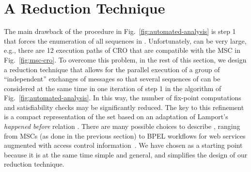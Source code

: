 \documentclass[conference]{llncs}
\newcommand{\CRO}{CRO}
\begin{document}
{\section{A Reduction Technique}  
\label{sec:verification}
The main drawback of the procedure in Fig.~\ref{fig:automated-analysis}
is step 1 that forces the enumeration of all sequences in .
Unfortunately,  can be very large, e.g., there are 12 execution paths of \CRO{}
that are compatible with the MSC in Fig.~\ref{fig:msc-cro}.
To overcome this problem, in the rest of
this section, we design a reduction technique that allows for the
parallel execution of a group of ``independent'' exchanges of messages
so that several sequences of  can be considered at the same time
in one iteration of step 1 in the algorithm of
Fig.~\ref{fig:automated-analysis}. In this way, the number of fix-point
computations and satisfiability checks may be significantly reduced. The
key to this refinement is a compact representation of the set 
based on an adaptation of Lamport's \emph{happened before} relation
 \cite{lamport-comm}. There are many possible choices to
describe , ranging from MSCs (as done in the previous section)
to BPEL workflows for web services augmented with access control
information~\cite{pacibertino}. We have chosen  as a starting
point because it is at the same time simple and general, and simplifies
the design of our reduction technique.

}
\end{document}
